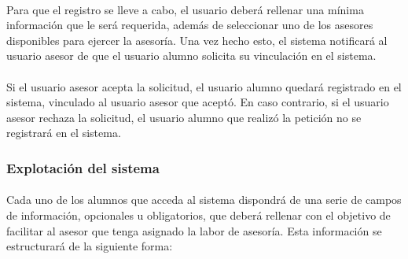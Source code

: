       \paragraph{}Para que el registro se lleve a cabo, el usuario deberá
      rellenar una mínima información que le será requerida, además de
      seleccionar uno de los asesores disponibles para ejercer la asesoría. Una
      vez hecho esto, el sistema notificará al usuario asesor de que el usuario
      alumno solicita su vinculación en el sistema.

      \paragraph{}Si el usuario asesor acepta la solicitud, el usuario alumno
      quedará registrado en el sistema, vinculado al usuario asesor que aceptó.
      En caso contrario, si el usuario asesor rechaza la solicitud, el usuario
      alumno que realizó la petición no se registrará en el sistema.

      \subsubsection{Explotación del sistema}

      \paragraph{}Cada uno de los alumnos que acceda al sistema dispondrá
      de una serie de campos de información, opcionales u obligatorios, que
      deberá rellenar con el objetivo de facilitar al asesor que tenga asignado
      la labor de asesoría. Esta información se estructurará de la siguiente
      forma:

